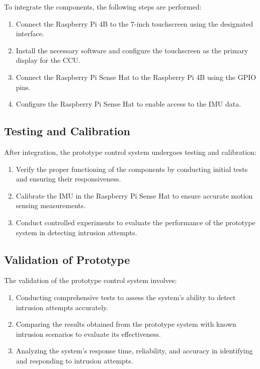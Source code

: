     To integrate the components, the following steps are performed:

    \begin{enumerate}
        \item Connect the Raspberry Pi 4B to the 7-inch touchscreen using the designated interface.
        \item Install the necessary software and configure the touchscreen as the primary display for the CCU.
        \item Connect the Raspberry Pi Sense Hat to the Raspberry Pi 4B using the GPIO pins.
        \item Configure the Raspberry Pi Sense Hat to enable access to the IMU data.
    \end{enumerate}

    \subsection{Testing and Calibration}

    After integration, the prototype control system undergoes testing and calibration:

    \begin{enumerate}
        \item Verify the proper functioning of the components by conducting initial tests and ensuring their responsiveness.
        \item Calibrate the IMU in the Raspberry Pi Sense Hat to ensure accurate motion sensing measurements.
        \item Conduct controlled experiments to evaluate the performance of the prototype system in detecting intrusion attempts.
    \end{enumerate}

    \subsection{Validation of Prototype}

    The validation of the prototype control system involves:

    \begin{enumerate}
        \item Conducting comprehensive tests to assess the system's ability to detect intrusion attempts accurately.
        \item Comparing the results obtained from the prototype system with known intrusion scenarios to evaluate its effectiveness.
        \item Analyzing the system's response time, reliability, and accuracy in identifying and responding to intrusion attempts.
    \end{enumerate}

